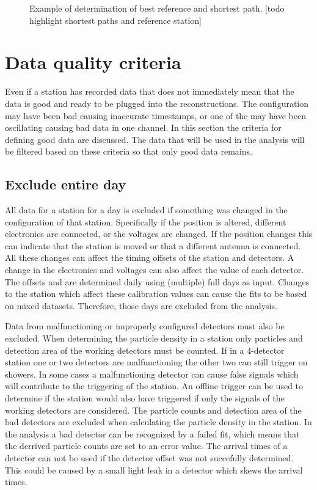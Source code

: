 \begin{figure}
    \centering
    
    \caption{Example of determination of best reference and shortest path. [todo highlight shortest paths and reference station]}
    \label{fig:shortest_path}
\end{figure}


\section{Data quality criteria}
\label{sec:data_quality_criteria}

Even if a station has recorded data that does not immediately mean that the data is good and ready to be plugged into the reconstructions. The \gps configuration may have been bad causing inaccurate timestamps, or one of the \pmts may have been oscillating causing bad data in one channel. In this section the criteria for defining good data are discussed. The data that will be used in the analysis will be filtered based on these criteria so that only good data remains.


\subsection{Exclude entire day}

All data for a station for a day is excluded if something was changed in the configuration of that station. Specifically if the \gps position is altered, different electronics are connected, or the \pmt voltages are changed. If the \gps position changes this can indicate that the station is moved or that a different \gps antenna is connected. All these changes can affect the timing offsets of the station and detectors. A change in the electronics and voltages can also affect the \mpv value of each detector. The offsets and \mpv are determined daily using (multiple) full days as input. Changes to the station which affect these calibration values can cause the fits to be based on mixed datasets. Therefore, those days are excluded from the analysis.

Data from malfunctioning or improperly configured detectors must also be excluded. When determining the particle density in a station only particles and detection area of the working detectors must be counted. If in a 4-detector station one or two detectors are malfunctioning the other two can still trigger on showers. In some cases a malfunctioning detector can cause false signals which will contribute to the triggering of the station. An offline trigger can be used to determine if the station would also have triggered if only the signals of the working detectors are considered. The particle counts and detection area of the bad detectors are excluded when calculating the particle density in the station. In the analysis a bad detector can be recognized by a failed \mpv fit, which means that the derrived particle counts are set to an error value. The arrival times of a detector can not be used if the detector offset was not succefully determined. This could be caused by a small light leak in a detector which skews the arrival times.


